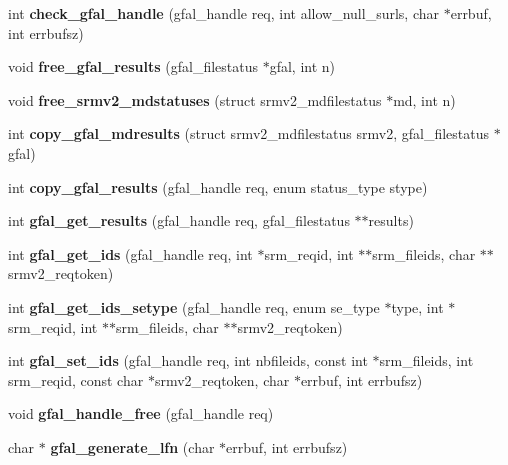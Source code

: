 \begin{CompactItemize}
\item 
int \textbf{check\_\-gfal\_\-handle} (gfal\_\-handle req, int allow\_\-null\_\-surls, char $\ast$errbuf, int errbufsz)\label{gfal__common_8c_5d7d3c5d5706978bc4ab531df7e9d2db}

\item 
void \textbf{free\_\-gfal\_\-results} (gfal\_\-filestatus $\ast$gfal, int n)\label{gfal__common_8c_9567fdc300b34b1274cc43fef14b5f90}

\item 
void \textbf{free\_\-srmv2\_\-mdstatuses} (struct srmv2\_\-mdfilestatus $\ast$md, int n)\label{gfal__common_8c_7db5dc9eefae3a89e01fb3789e608000}

\item 
int \textbf{copy\_\-gfal\_\-mdresults} (struct srmv2\_\-mdfilestatus srmv2, gfal\_\-filestatus $\ast$gfal)\label{gfal__common_8c_bd3c2238eb91ebb15768a8699c6b885e}

\item 
int \textbf{copy\_\-gfal\_\-results} (gfal\_\-handle req, enum status\_\-type stype)\label{gfal__common_8c_200971e5013639a2e76b7befccb6b787}

\item 
int \textbf{gfal\_\-get\_\-results} (gfal\_\-handle req, gfal\_\-filestatus $\ast$$\ast$results)\label{gfal__common_8c_eca2b9fa8fd9a298d159a6496018a402}

\item 
int \textbf{gfal\_\-get\_\-ids} (gfal\_\-handle req, int $\ast$srm\_\-reqid, int $\ast$$\ast$srm\_\-fileids, char $\ast$$\ast$srmv2\_\-reqtoken)\label{gfal__common_8c_bae0a79398e15b3aafc8aa6cfbbf8ca4}

\item 
int \textbf{gfal\_\-get\_\-ids\_\-setype} (gfal\_\-handle req, enum se\_\-type $\ast$type, int $\ast$srm\_\-reqid, int $\ast$$\ast$srm\_\-fileids, char $\ast$$\ast$srmv2\_\-reqtoken)\label{gfal__common_8c_bb5156da7f449f5708520280c5aaa956}

\item 
int \textbf{gfal\_\-set\_\-ids} (gfal\_\-handle req, int nbfileids, const int $\ast$srm\_\-fileids, int srm\_\-reqid, const char $\ast$srmv2\_\-reqtoken, char $\ast$errbuf, int errbufsz)\label{gfal__common_8c_2b8a1d53b7e8fe9a0613483cfe4558d4}

\item 
void \textbf{gfal\_\-handle\_\-free} (gfal\_\-handle req)\label{gfal__common_8c_3138c599f0c7b589990aba326a463230}

\item 
char $\ast$ \textbf{gfal\_\-generate\_\-lfn} (char $\ast$errbuf, int errbufsz)\label{group__internal__group_gcd48b57bf9659be5204319918c6f9d20}


\end{CompactItemize}
